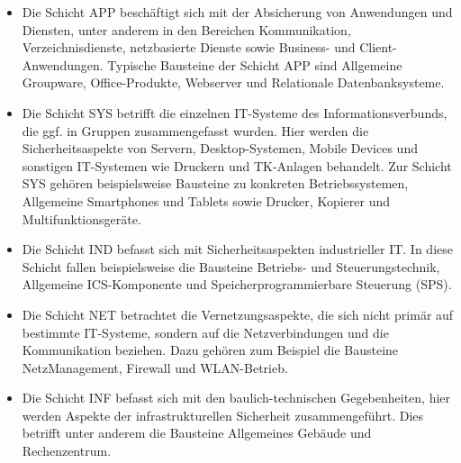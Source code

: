 {\begin{itemize}
	\item Die Schicht APP beschäftigt sich mit der Absicherung von Anwendungen und Diensten, unter anderem in den
	Bereichen Kommunikation, Verzeichnisdienste, netzbasierte Dienste sowie Business- und Client-Anwendungen.
	Typische Bausteine der Schicht APP sind Allgemeine Groupware, Office-Produkte, Webserver und Relationale
	Datenbanksysteme.
	\item Die Schicht SYS betrifft die einzelnen IT-Systeme des Informationsverbunds, die ggf. in Gruppen zusammengefasst wurden. Hier werden die Sicherheitsaspekte von Servern, Desktop-Systemen, Mobile Devices und sonstigen IT-Systemen wie Druckern und TK-Anlagen behandelt. Zur Schicht SYS gehören beispielsweise Bausteine zu
	konkreten Betriebssystemen, Allgemeine Smartphones und Tablets sowie Drucker, Kopierer und Multifunktionsgeräte.
	\item Die Schicht IND befasst sich mit Sicherheitsaspekten industrieller IT. In diese Schicht fallen beispielsweise die Bausteine Betriebs- und Steuerungstechnik, Allgemeine ICS-Komponente und Speicherprogrammierbare Steuerung (SPS).
	\item Die Schicht NET betrachtet die Vernetzungsaspekte, die sich nicht primär auf bestimmte IT-Systeme, sondern
	auf die Netzverbindungen und die Kommunikation beziehen. Dazu gehören zum Beispiel die Bausteine NetzManagement, Firewall und WLAN-Betrieb.
	\item Die Schicht INF befasst sich mit den baulich-technischen Gegebenheiten, hier werden Aspekte der infrastrukturellen Sicherheit zusammengeführt. Dies betrifft unter anderem die Bausteine Allgemeines Gebäude und Rechenzentrum.
\end{itemize}}\autocite[][S.23-24]{bundesamt_fur_sicherheit_in_der_informationstechnik_bsi_it-grundschutz-kompendium_2020}


